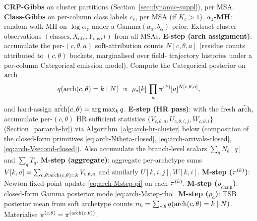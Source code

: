 \begin{algorithm}[H]
\caption{One outer iteration of the archetype-variant trainer}
\label{alg:arch-em}
\begin{algorithmic}[1]
\State \textbf{CRP-Gibbs} on cluster partitions
       (Section~\ref{sec:dynamic-suppl}), per MSA.
\State \textbf{Class-Gibbs} on per-column class labels $c_s$, per MSA
       (if $K_c > 1$).
\State \textbf{$\alpha_z$-MH}: random-walk MH on $\log\alpha_z$ under
       a Gamma$(a_\alpha, b_\alpha)$ prior.
\State Extract cluster observations $(\text{classes}, X_{\text{obs}},
       Y_{\text{obs}}, t)$ from all MSAs.
\State \textbf{E-step (arch assignment)}: accumulate the per-$(c, \theta,
       a)$ soft-attribution counts $N[c, \theta, a]$ (residue counts
       attributed to $(c, \theta)$ buckets, marginalised over field-
       trajectory histories under a per-column Categorical emission
       model). Compute the Categorical posterior on $\mathrm{arch}$
\begin{equation}
  q(\mathrm{arch}(c, \theta) = k \mid N) \;\propto\;
    \rho_a[k]\, \prod_a \pi^{(k)}[a]^{N[c, \theta, a]},
  \label{eq:arch-Estep-cat}
\end{equation}
and hard-assign $\hat{\mathrm{arch}}(c, \theta) = \arg\max_k q$.
\State \textbf{E-step (HR pass)}: with the fresh $\hat{\mathrm{arch}}$, accumulate
       per-$(c, \theta)$ HR sufficient statistics
       $\{V_{c, \theta, a}, U_{c, \theta, i, j}, W_{c, \theta, i}\}$
       (Section~\ref{par:arch-hr}) via
       Algorithm~\ref{alg:arch-hr-cluster} below (composition of the
       closed-form primitives \eqref{eq:arch-Ntheta-closed},
       \eqref{eq:arch-arrivals-closed},
       \eqref{eq:arch-Vsecond-closed}). Also accumulate the branch-level
       scalars $\sum_q N_\theta[q]$ and $\sum_q T_q$.
\State \textbf{M-step (aggregate)}: aggregate per-archetype sums
       $V[k, a] = \sum_{c, \theta: \hat{\mathrm{arch}}(c, \theta) = k}
       V_{c, \theta, a}$ and similarly $U[k, i, j], W[k, i]$.
\State \textbf{M-step ($\pi^{(k)}$)}: Newton fixed-point update
       \eqref{eq:arch-Mstep-pi} on each $\pi^{(k)}$.
\State \textbf{M-step ($\rho_{\text{chain}}$)}: closed-form Gamma
       posterior mode \eqref{eq:arch-Mstep-rho}.
\State \textbf{M-step ($\rho_a$)}: TSB posterior mean from soft
       archetype counts $n_k = \sum_{c, \theta} q(\mathrm{arch}(c, \theta) = k
       \mid N)$.
\State Materialise $\pi^{(c, \theta)} = \pi^{(\hat{\mathrm{arch}}(c, \theta))}$.
\end{algorithmic}
\end{algorithm}

